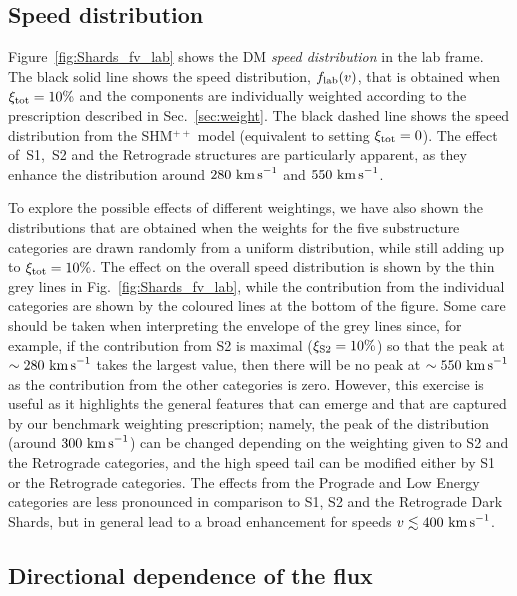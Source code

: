 \documentclass[prd,10pt,twocolumn,showpacs,nofootinbib,aps,superscriptaddress,preprintnumbers]{revtex4-1}
\newcommand{\kms}{\textrm{ km \!s}^{-1}}
\newcommand{\SHMpp}{SHM$^{++}$\xspace}
\begin{document}

  \subsection{Speed distribution}
  
Figure~\ref{fig:Shards_fv_lab} shows the DM {\it speed
  distribution} in the lab frame.  The black solid line shows the
speed distribution, $f_{\rm{lab}}(v)$, that is obtained when
$\xi_{\rm{tot}}=10\%$ and the components are individually weighted
according to the prescription described in Sec.~\ref{sec:weight}.  The
black dashed line shows the speed distribution from the \SHMpp model
(equivalent to setting $\xi_{\rm tot} = 0$).  The effect of~S1,~S2 and
the Retrograde structures are particularly apparent, as they enhance
the distribution around $280\kms$ and $550\kms$. 

To explore the possible effects of different weightings, we have also shown the distributions that are obtained when the
weights for the five substructure categories are drawn randomly from a
uniform distribution, while still adding up to
$\xi_{\rm{tot}}=10\%$. The effect on the overall speed distribution is
shown by the thin grey lines in Fig.~\ref{fig:Shards_fv_lab}, while the
contribution from the individual categories are shown by the coloured
lines at the bottom of the figure. Some care should be taken when
interpreting the envelope of the grey lines since, for example, if the contribution
from S2 is maximal ($\xi_{\rm{S2}}=10\%$) so that the peak at
$\sim280\kms$ takes the largest value, then there will be no peak at
$\sim550\kms$ as the contribution from the other categories is zero.
However, this exercise is useful as it highlights the general
features that can emerge and that are captured by our benchmark
weighting prescription; namely, the peak of the distribution (around
$300\kms$) can be changed depending on the weighting given to S2 and
the Retrograde categories, and the high speed tail can be modified
either by S1 or the Retrograde categories. The effects from the Prograde and Low Energy categories are
less pronounced in comparison to S1, S2 and the Retrograde Dark
Shards, but in general lead to a broad enhancement for speeds $v\lesssim 400 \kms$.


  \subsection{Directional dependence of the flux}\label{sec:DMfluxEarth}
\end{document}
